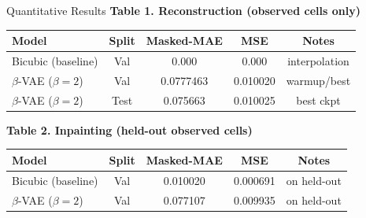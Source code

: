 \documentclass[11pt,aspectratio=169]{beamer}
\begin{document}
\begin{frame}{Quantitative Results}
    \small
    \textbf{Table 1. Reconstruction (observed cells only)}
    \begin{tabular}{lcccc}
        \toprule
        Model                     & Split & Masked-MAE & MSE      & Notes         \\
        \midrule
        Bicubic (baseline)        & Val   & 0.000      & 0.000    & interpolation \\
        $\beta$-VAE ($\beta{=}2$) & Val   & 0.0777463  & 0.010020 & warmup/best   \\
        $\beta$-VAE ($\beta{=}2$) & Test  & 0.075663   & 0.010025 & best ckpt     \\
        \bottomrule
    \end{tabular}

    \vspace{6pt}
    \textbf{Table 2. Inpainting (held-out observed cells)}
    \begin{tabular}{lcccc}
        \toprule
        Model                     & Split & Masked-MAE & MSE      & Notes       \\
        \midrule
        Bicubic (baseline)        & Val   & 0.010020   & 0.000691 & on held-out \\
        $\beta$-VAE ($\beta{=}2$) & Val   & 0.077107   & 0.009935 & on held-out \\
        \bottomrule
    \end{tabular}
\end{frame}

\end{document}
